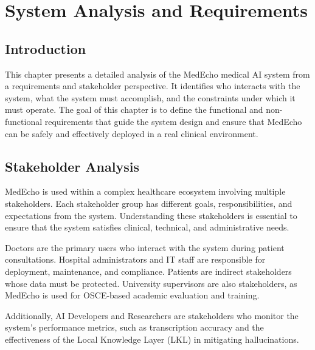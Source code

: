 
\chapter{System Analysis and Requirements}\label{chapter:analysis}

\section{Introduction}\label{sec:analysis:reqs}
This chapter presents a detailed analysis of the MedEcho medical AI system from a requirements and stakeholder perspective. It identifies who interacts with the system, what the system must accomplish, and the constraints under which it must operate. The goal of this chapter is to define the functional and non-functional requirements that guide the system design and ensure that MedEcho can be safely and effectively deployed in a real clinical environment.



\section{Stakeholder Analysis}
\label{sec:analysis:analysis} 
MedEcho is used within a complex healthcare ecosystem involving multiple stakeholders. Each stakeholder group has different goals, responsibilities, and expectations from the system. Understanding these stakeholders is essential to ensure that the system satisfies clinical, technical, and administrative needs.

Doctors are the primary users who interact with the system during patient consultations. Hospital administrators and IT staff are responsible for deployment, maintenance, and compliance. Patients are indirect stakeholders whose data must be protected. University supervisors are also stakeholders, as MedEcho is used for OSCE-based academic evaluation and training.

Additionally, AI Developers and Researchers are stakeholders who monitor the system’s performance metrics, such as transcription accuracy and the effectiveness of the Local Knowledge Layer (LKL) in mitigating hallucinations.


